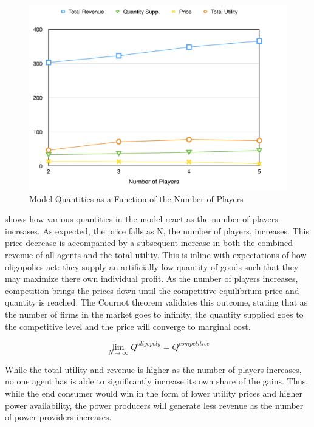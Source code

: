 \documentclass[12pt]{article}
\begin{document}
	\begin{figure}[ht!]
		\begin{center}
		\includegraphics[scale = .45]{numP.png}
		\caption{Model Quantities as a Function of the Number of Players}
		\label{numP}
		\end{center}
	\end{figure}

 shows how various quantities in the model react as the number of players increases. As expected, the price falls as N, the number of players, increases. This price decrease is accompanied by a subsequent increase in both the combined revenue of all agents and the total utility. This is inline with expectations of how oligopolies act: they  supply an artificially low quantity of goods such that they may maximize there own individual profit. As the number of players increases, competition brings the prices down until the competitive equilibrium price and quantity is reached. The Cournot theorem validates this outcome, stating that as the number of firms in the market goes to infinity, the quantity supplied goes to the competitive level and the price will converge to marginal cost.

	\begin{equation}
		\lim_{N\to\infty} Q^{oligopoly} = Q^{competitive}
	\end{equation}

While the total utility and revenue is higher as the number of players increases, no one agent has is able to significantly increase its own share of the gains. Thus, while the end consumer would win in the form of lower utility prices and higher power availability, the power producers will generate less revenue as the number of power providers increases. \*
\end{document}
